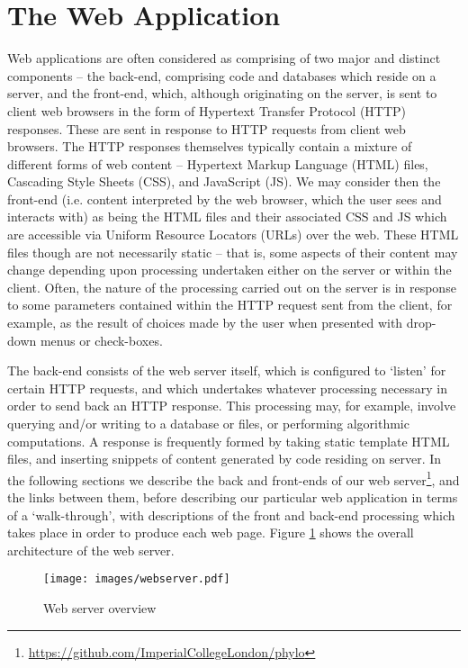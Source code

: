 \documentclass[12pt,a4paper]{article}
\begin{document}
\section{The Web Application}
\label{sec:webserver}
Web applications are often considered as comprising of two major and distinct components -- the back-end, comprising code and databases which reside on a server, and the front-end, which, although originating on the server, is sent to client web browsers in the form of Hypertext Transfer Protocol (HTTP) responses. These are sent in response to HTTP requests from client web browsers. The HTTP responses themselves typically contain a mixture of different forms of web content -- Hypertext Markup Language (HTML) files, Cascading Style Sheets (CSS), and JavaScript (JS). We may consider then the front-end (i.e. content interpreted by the web browser, which the user sees and interacts with) as being the HTML files and their associated CSS and JS which are accessible via Uniform Resource Locators (URLs) over the web. These HTML files though are not necessarily static -- that is, some aspects of their content may change depending upon processing undertaken either on the server or within the client. Often, the nature of the processing carried out on the server is in response to some parameters contained within the HTTP request sent from the client, for example, as the result of choices made by the user when presented with drop-down menus or check-boxes.

The back-end consists of the web server itself, which is configured to `listen' for certain HTTP requests, and which undertakes whatever processing necessary in order to send back an HTTP response. This processing may, for example, involve querying and/or writing to a database or files, or performing algorithmic computations. A response is frequently formed by taking static template HTML files, and inserting snippets of content generated by code residing on server. In the following sections we describe the back and front-ends of our web server\footnote{\url{https://github.com/ImperialCollegeLondon/phylo}}, and the links between them, before describing our particular web application in terms of a `walk-through', with descriptions of the front and back-end processing which takes place in order to produce each web page. Figure \ref{fig:webserver} shows the overall architecture of the web server.\\

\begin{figure}[H]
\centering 
\texttt{[image: images/webserver.pdf]} 
\caption{Web server overview}
\label{fig:webserver}
\end{figure}
\end{document}
